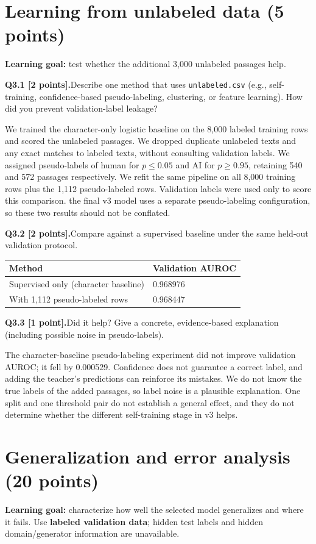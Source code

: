 \documentclass[11pt,letterpaper]{article}
\newcommand{\question}[2]{\needspace{4\baselineskip}\par\addvspace{0.45em}\noindent\textbf{#1}\quad #2\par\nobreak\vspace{0.1em}}
\begin{document}
\section{Learning from unlabeled data (5 points)}
\textbf{Learning goal:} test whether the additional 3,000 unlabeled passages help.
\question{Q3.1 [2 points].}{Describe one method that uses \texttt{unlabeled.csv} (e.g., self-training, confidence-based pseudo-labeling, clustering, or feature learning). How did you prevent validation-label leakage?}
We trained the character-only logistic baseline on the 8,000 labeled training rows and scored the unlabeled passages. We dropped duplicate unlabeled texts and any exact matches to labeled texts, without consulting validation labels. We assigned pseudo-labels of human for $p\leq0.05$ and AI for $p\geq0.95$, retaining 540 and 572 passages respectively. We refit the same pipeline on all 8,000 training rows plus the 1,112 pseudo-labeled rows. Validation labels were used only to score this comparison. the final v3 model uses a separate pseudo-labeling configuration, so these two results should not be conflated.
\question{Q3.2 [2 points].}{Compare against a supervised baseline under the same held-out validation protocol.}
\begin{tabularx}{\linewidth}{@{}Yp{1.5in}@{}}\toprule Method & Validation AUROC \\ \midrule Supervised only (character baseline) & 0.968976 \\ With 1,112 pseudo-labeled rows & 0.968447 \\ \bottomrule\end{tabularx}
\question{Q3.3 [1 point].}{Did it help? Give a concrete, evidence-based explanation (including possible noise in pseudo-labels).}
The character-baseline pseudo-labeling experiment did not improve validation AUROC; it fell by 0.000529. Confidence does not guarantee a correct label, and adding the teacher's predictions can reinforce its mistakes. We do not know the true labels of the added passages, so label noise is a plausible explanation. One split and one threshold pair do not establish a general effect, and they do not determine whether the different self-training stage in v3 helps.
\newpage
\section{Generalization and error analysis (20 points)}
\textbf{Learning goal:} characterize how well the selected model generalizes and where it fails. Use \textbf{labeled validation data}; hidden test labels and hidden domain/generator information are unavailable.
\end{document}
